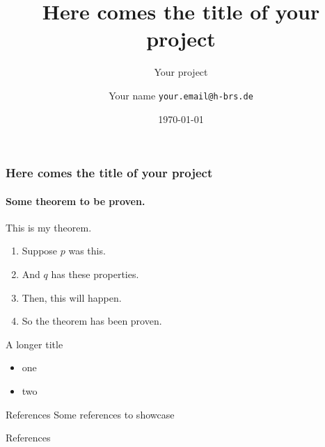 \documentclass{beamer}
\title{Here comes the title of your project}
\institute{Your department}
\subtitle{Your project}
\date{\today}
\author{Your name \texttt{your.email@h-brs.de}}
\begin{document}
\begin{frame}
  \titlepage
\end{frame}


\begin{frame}
  \frametitle{Here comes the title of your project}
  \framesubtitle{Some theorem to be proven.}
  \begin{theorem}
    This is my theorem. \end{theorem}
  \begin{enumerate}
    \item<1-| alert@1> Suppose $p$ was this.
    \item<2-> And $q$ has these properties.
    \item<3-> Then, this will happen.
    \item<1-> So the theorem has been proven.
  \end{enumerate}
\end{frame}

\begin{frame}{A longer title}
  \begin{itemize}
    \item one
    \item two
  \end{itemize}
\end{frame}

\begin{frame}{References}
  Some references to showcase \cite{knuth92,ConcreteMath,Simpson,Er01,greenwade93}
\end{frame}

\begin{frame}[allowframebreaks]{References}
  
\end{frame}
\end{document}
